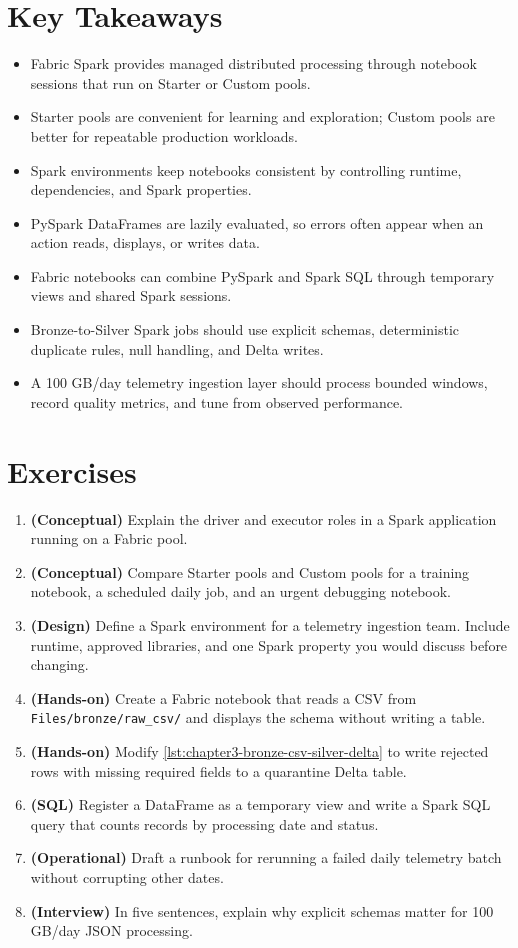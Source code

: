 \section*{Key Takeaways}
\begin{itemize}
    \item Fabric Spark provides managed distributed processing through notebook sessions that run on Starter or Custom pools.
    \item Starter pools are convenient for learning and exploration; Custom pools are better for repeatable production workloads.
    \item Spark environments keep notebooks consistent by controlling runtime, dependencies, and Spark properties.
    \item PySpark DataFrames are lazily evaluated, so errors often appear when an action reads, displays, or writes data.
    \item Fabric notebooks can combine PySpark and Spark SQL through temporary views and shared Spark sessions.
    \item Bronze-to-Silver Spark jobs should use explicit schemas, deterministic duplicate rules, null handling, and Delta writes.
    \item A 100 GB/day telemetry ingestion layer should process bounded windows, record quality metrics, and tune from observed performance.
\end{itemize}

\section{Exercises}
\begin{enumerate}
    \item \textbf{(Conceptual)} Explain the driver and executor roles in a Spark application running on a Fabric pool.
    \item \textbf{(Conceptual)} Compare Starter pools and Custom pools for a training notebook, a scheduled daily job, and an urgent debugging notebook.
    \item \textbf{(Design)} Define a Spark environment for a telemetry ingestion team. Include runtime, approved libraries, and one Spark property you would discuss before changing.
    \item \textbf{(Hands-on)} Create a Fabric notebook that reads a CSV from \texttt{Files/bronze/raw\_csv/} and displays the schema without writing a table.
    \item \textbf{(Hands-on)} Modify \cref{lst:chapter3-bronze-csv-silver-delta} to write rejected rows with missing required fields to a quarantine Delta table.
    \item \textbf{(SQL)} Register a DataFrame as a temporary view and write a Spark SQL query that counts records by processing date and status.
    \item \textbf{(Operational)} Draft a runbook for rerunning a failed daily telemetry batch without corrupting other dates.
    \item \textbf{(Interview)} In five sentences, explain why explicit schemas matter for 100 GB/day JSON processing.
\end{enumerate}

